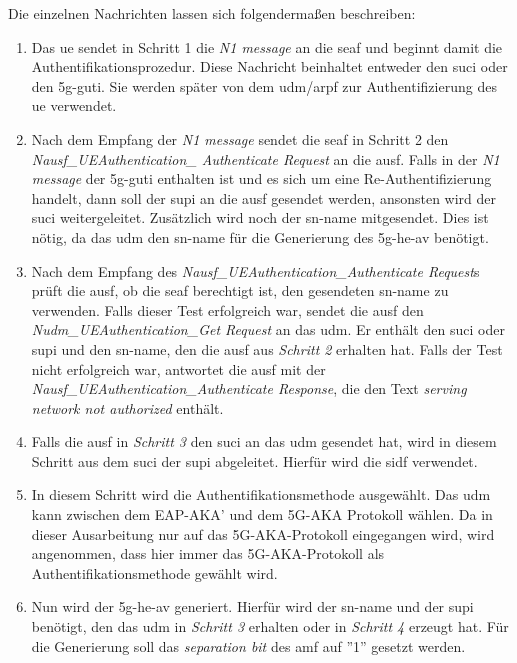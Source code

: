 Die einzelnen Nachrichten lassen sich folgendermaßen beschreiben: %

\begin{enumerate}
\item Das \gls{ue} sendet in Schritt 1 die \textit{N1 message} an die \gls{seaf} und beginnt damit die Authentifikationsprozedur.
Diese Nachricht beinhaltet entweder den \gls{suci} oder den \gls{5g-guti}.
Sie werden später von dem \gls{udm}/\gls{arpf} zur Authentifizierung des \gls{ue} verwendet.

\item Nach dem Empfang der \textit{N1 message} sendet die \gls{seaf} in Schritt 2 den \textit{Nausf\_UEAuthentication\_ Authenticate Request} an die \gls{ausf}.
Falls in der \textit{N1 message} der \gls{5g-guti} enthalten ist und es sich um eine Re-Authentifizierung handelt, dann soll der \gls{supi} an die \gls{ausf} gesendet werden, ansonsten wird der \gls{suci} weitergeleitet.
Zusätzlich wird noch der \gls{sn-name} mitgesendet.
Dies ist nötig, da das \gls{udm} den \gls{sn-name} für die Generierung des \gls{5g-he-av} benötigt.

\item Nach dem Empfang des \textit{Nausf\_UEAuthentication\_Authenticate Request}s prüft die \gls{ausf}, ob die \gls{seaf} berechtigt ist, den gesendeten \gls{sn-name} zu verwenden.
Falls dieser Test erfolgreich war, sendet die \gls{ausf} den \textit{Nudm\_UEAuthentication\_Get Request} an das \gls{udm}.
Er enthält den \gls{suci} oder \gls{supi} und den \gls{sn-name}, den die \gls{ausf} aus \textit{Schritt 2} erhalten hat.
Falls der Test nicht erfolgreich war, antwortet die \gls{ausf} mit der \textit{Nausf\_UEAuthentication\_Authenticate Response}, die den Text \textit{serving network not authorized} enthält.

\item Falls die \gls{ausf} in \textit{Schritt 3} den \gls{suci} an das \gls{udm} gesendet hat, wird in diesem Schritt aus dem \gls{suci} der \gls{supi} abgeleitet.
Hierfür wird die \gls{sidf} verwendet.

\item In diesem Schritt wird die Authentifikationsmethode ausgewählt.
Das \gls{udm} kann zwischen dem EAP-AKA' und dem 5G-AKA Protokoll wählen.
Da in dieser Ausarbeitung nur auf das 5G-AKA-Protokoll eingegangen wird, wird angenommen, dass hier immer das 5G-AKA-Protokoll als Authentifikationsmethode gewählt wird.

\item Nun wird der \gls{5g-he-av} generiert.
Hierfür wird der \gls{sn-name} und der \gls{supi} benötigt, den das \gls{udm} in \textit{Schritt 3} erhalten oder in \textit{Schritt 4} erzeugt hat.
Für die Generierung soll das \textit{separation bit} des \gls{amf} auf ''1'' gesetzt werden.


\end{enumerate}
